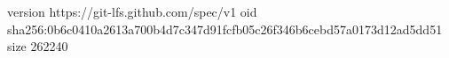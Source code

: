 version https://git-lfs.github.com/spec/v1
oid sha256:0b6c0410a2613a700b4d7c347d91fcfb05c26f346b6cebd57a0173d12ad5dd51
size 262240
